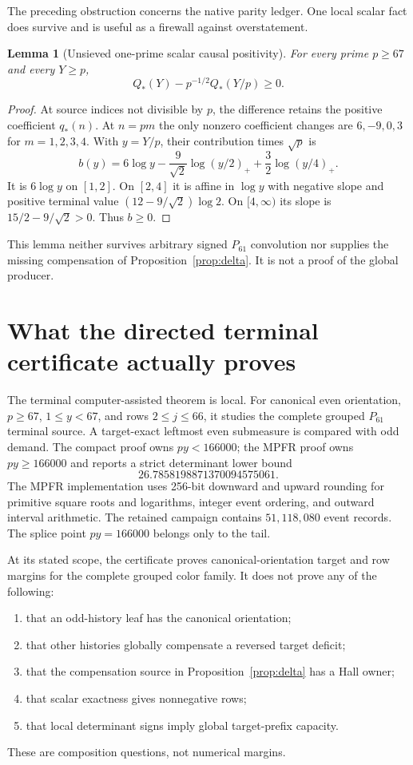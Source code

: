\documentclass[11pt]{article}
\newtheorem{lemma}[theorem]{Lemma}
\newcommand{\1}{\mathbf 1}
\begin{document}
The preceding obstruction concerns the native parity ledger.  One local scalar fact does survive and is useful as a firewall against overstatement.

\begin{lemma}[Unsieved one-prime scalar causal positivity]\label{lem:localcausal}
For every prime $p\ge67$ and every $Y\ge p$,
\[
Q_*(Y)-p^{-1/2}Q_*(Y/p)\ge0.
\]
\end{lemma}
\begin{proof}
At source indices not divisible by $p$, the difference retains the positive coefficient $q_*(n)$.  At $n=pm$ the only nonzero coefficient changes are $6,-9,0,3$ for $m=1,2,3,4$.  With $y=Y/p$, their contribution times $\sqrt p$ is
\[
b(y)=6\log y-\frac9{\sqrt2}\log(y/2)_+
+\frac32\log(y/4)_+.
\]
It is $6\log y$ on $[1,2]$.  On $[2,4]$ it is affine in $\log y$ with negative slope and positive terminal value $(12-9/\sqrt2)\log2$.  On $[4,\infty)$ its slope is $15/2-9/\sqrt2>0$.  Thus $b\ge0$.
\end{proof}

This lemma neither survives arbitrary signed $P_{61}$ convolution nor supplies the missing compensation of Proposition~\ref{prop:delta}.  It is not a proof of the global producer.

\section{What the directed terminal certificate actually proves}

The terminal computer-assisted theorem is local.  For canonical even orientation, $p\ge67$, $1\le y<67$, and rows $2\le j\le66$, it studies the complete grouped $P_{61}$ terminal source.  A target-exact leftmost even submeasure is compared with odd demand.  The compact proof owns $py<166000$; the MPFR proof owns $py\ge166000$ and reports a strict determinant lower bound
\[
26.7858198871370094575061.
\]
The MPFR implementation uses 256-bit downward and upward rounding for primitive square roots and logarithms, integer event ordering, and outward interval arithmetic.  The retained campaign contains $51{,}118{,}080$ event records.  The splice point $py=166000$ belongs only to the tail.

At its stated scope, the certificate proves canonical-orientation target and row margins for the complete grouped color family.  It does not prove any of the following:
\begin{enumerate}[label=(\alph*)]
\item that an odd-history leaf has the canonical orientation;
\item that other histories globally compensate a reversed target deficit;
\item that the compensation source in Proposition~\ref{prop:delta} has a Hall owner;
\item that scalar exactness gives nonnegative rows;
\item that local determinant signs imply global target-prefix capacity.
\end{enumerate}
These are composition questions, not numerical margins.
\end{document}
